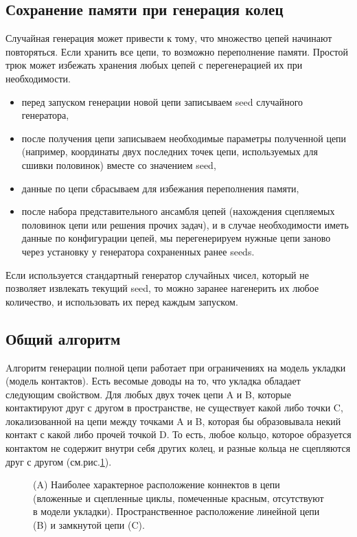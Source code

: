 \documentclass[tikz,a4paper]{scrartcl} %
\begin{document}
\subsection*{Сохранение памяти при генерация колец}
Случайная генерация может привести к тому, что множество цепей начинают повторяться. Если хранить все цепи, то возможно переполнение памяти. Простой трюк может избежать хранения любых цепей с перегенерацией их при необходимости.
\begin{itemize}
\item перед запуском генерации новой цепи записываем seed случайного генератора,
\item после получения цепи записываем необходимые параметры полученной цепи (например, координаты двух последних точек цепи, используемых для сшивки половинок) вместе со значением seed,
\item данные по цепи сбрасываем для избежания переполнения памяти,
\item после набора представительного ансамбля цепей (нахождения сцепляемых половинок цепи или решения прочих задач), и в случае необходимости иметь данные по конфигурации цепей, мы перегенерируем нужные цепи заново через установку у генератора сохраненных ранее seeds.
\end{itemize}
Если используется стандартный генератор случайных чисел, который не позволяет извлекать текущий seed, то можно заранее нагенерить их любое количество, и использовать их перед каждым запуском.

\subsection*{Общий алгоритм}
Aлгоритм генерации полной цепи работает при ограничениях на модель укладки (модель контактов). Есть весомые доводы на то, что укладка обладает следующим свойством. Для любых двух точек цепи A и B, которые контактируют друг с другом в пространстве, не существует какой либо точки C, локализованной на цепи между точками A и B, которая бы образовывала некий контакт с какой либо прочей точкой D. То есть, любое кольцо, которое образуется контактом не содержит внутри себя других колец, и разные кольца не сцепляются друг с другом (см.рис.\ref{pic:connects}).

\begin{figure}[h]
\caption{(A) Наиболее характерное расположение коннектов в цепи (вложенные и сцепленные циклы, помеченные красным, отсутствуют в модели укладки). Пространственное расположение линейной цепи (B) и замкнутой цепи (C).}
\label{pic:connects}
\end{figure}
\end{document}
